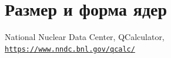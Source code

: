 \documentclass[12pt]{article}
\begin{document}
\section{Размер и форма ядер}


\medskip
\begin{thebibliography}{9}
	National Nuclear Data Center, QCalculator,
	\\\texttt{\url{https://www.nndc.bnl.gov/qcalc/}}
\end{thebibliography}
\end{document}
